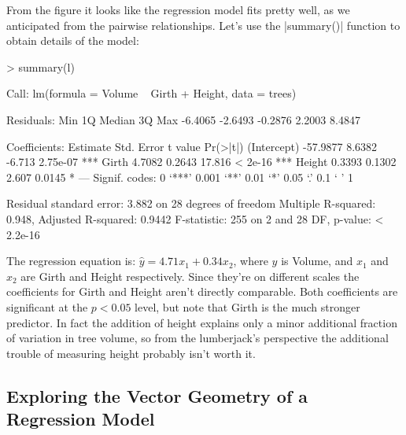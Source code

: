 From the figure it looks like the regression model fits pretty well, as we anticipated  from the pairwise relationships.  Let's use the |summary()| function to obtain details of the model:
\begin{R}
> summary(l)

Call:
lm(formula = Volume ~ Girth + Height, data = trees)

Residuals:
    Min      1Q  Median      3Q     Max
-6.4065 -2.6493 -0.2876  2.2003  8.4847

Coefficients:
            Estimate Std. Error t value Pr(>|t|)
(Intercept) -57.9877     8.6382  -6.713 2.75e-07 ***
Girth         4.7082     0.2643  17.816  < 2e-16 ***
Height        0.3393     0.1302   2.607   0.0145 *
---
Signif. codes:  0 ‘***’ 0.001 ‘**’ 0.01 ‘*’ 0.05 ‘.’ 0.1 ‘ ’ 1

Residual standard error: 3.882 on 28 degrees of freedom
Multiple R-squared: 0.948,  Adjusted R-squared: 0.9442
F-statistic:   255 on 2 and 28 DF,  p-value: < 2.2e-16
\end{R}
%
The regression equation is: $\hat{y} = 4.71x_1 + 0.34x_2$, where $y$ is Volume, and $x_1$ and $x_2$ are Girth and Height respectively. Since they're on different scales the coefficients for Girth and Height aren't directly comparable. Both coefficients are significant at the $p<0.05$ level, but note that Girth is the much stronger predictor. In fact the addition of height explains only a minor additional fraction of variation in tree volume, so from the lumberjack's perspective the additional trouble of measuring height probably isn't worth it.

\subsection{Exploring the Vector Geometry of a Regression Model}

